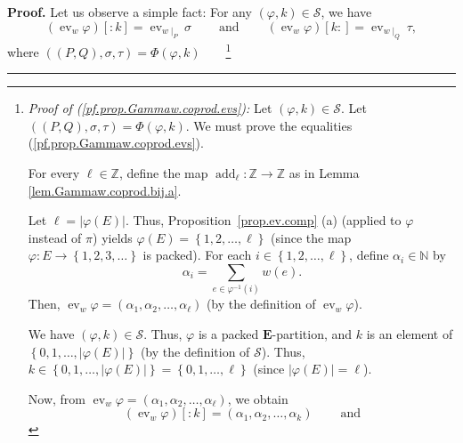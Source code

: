 \documentclass[numbers=enddot,12pt,final,onecolumn,notitlepage,abstracton]{scrartcl}
\theoremstyle{definition}
\newenvironment{proof}[1][Proof]{\noindent\textbf{#1.} }{\ \rule{0.5em}{0.5em}}
\let\sumnonlimits\sum
\renewcommand{\sum}{\sumnonlimits\limits}
\newenvironment{verlong}{}{}
\newcommand{\EE}{{\mathbf{E}}}
\newcommand{\NN}{{\mathbb{N}}}
\begin{document}
\begin{verlong}
\begin{proof}
Let us observe a simple fact: For any $\left(  \varphi,k\right)
\in\mathcal{S}$, we have%
\begin{equation}
\left(  \operatorname{ev}_{w}\varphi\right)  \left[  :k\right]
=\operatorname{ev}_{w\mid_{P}}\sigma\ \ \ \ \ \ \ \ \ \ \text{and}%
\ \ \ \ \ \ \ \ \ \ \left(  \operatorname{ev}_{w}\varphi\right)  \left[
k:\right]  =\operatorname{ev}_{w\mid_{Q}}\tau,
\label{pf.prop.Gammaw.coprod.evs}%
\end{equation}
where $\left(  \left(  P,Q\right)  ,\sigma,\tau\right)  =\Phi\left(
\varphi,k\right)  $\ \ \ \ \footnote{\textit{Proof of
(\ref{pf.prop.Gammaw.coprod.evs}):} Let $\left(  \varphi,k\right)
\in\mathcal{S}$. Let $\left(  \left(  P,Q\right)  ,\sigma,\tau\right)
=\Phi\left(  \varphi,k\right)  $. We must prove the equalities
(\ref{pf.prop.Gammaw.coprod.evs}).
\par
For every $\ell\in\mathbb{Z}$, define the map
$\operatorname{add}_{\ell}:\mathbb{Z}\rightarrow\mathbb{Z}$ as in
Lemma \ref{lem.Gammaw.coprod.bij.a}.
\par
Let $\ell=\left\vert \varphi\left(  E\right)  \right\vert $.
Thus, Proposition~\ref{prop.ev.comp} (a) (applied to $\varphi$
instead of $\pi$) yields
$\varphi\left(  E\right)  =\left\{  1,2,\ldots,\ell\right\}  $ (since
the map $\varphi : E \to \left\{ 1, 2, 3, \ldots \right\}$ is packed).
For each $i\in\left\{  1,2,\ldots,\ell\right\}  $,
define $\alpha_{i}\in \NN $ by
\begin{equation}
\alpha_{i}=\sum_{e\in\varphi^{-1}\left(  i\right)  }w\left(  e\right)  .
\label{pf.prop.Gammaw.coprod.evs.pf.alphai}%
\end{equation}
Then, $\operatorname{ev}_{w}\varphi=\left(  \alpha_{1},\alpha
_{2},\ldots,\alpha_{\ell}\right)  $ (by the definition of
$\operatorname{ev}_{w}\varphi$).
\par
We have $\left(  \varphi,k\right)  \in\mathcal{S}$. Thus, $\varphi$ is a
packed $\EE$-partition, and $k$ is an element of $\left\{
0,1,\ldots,\left\vert \varphi\left(  E\right)  \right\vert \right\}  $ (by the
definition of $\mathcal{S}$). Thus, $k\in\left\{  0,1,\ldots,\left\vert
\varphi\left(  E\right)  \right\vert \right\}  =\left\{  0,1,\ldots
,\ell\right\}  $ (since $\left\vert \varphi\left(  E\right)  \right\vert
=\ell$).
\par
Now, from $\operatorname{ev}_{w}\varphi=\left(  \alpha_{1}%
,\alpha_{2},\ldots,\alpha_{\ell}\right)  $, we obtain%
\[
\left(  \operatorname{ev}_{w}\varphi\right)  \left[  :k\right]  =\left(
\alpha_{1},\alpha_{2},\ldots,\alpha_{k}\right)  \ \ \ \ \ \ \ \ \ \ \text{and}%
\]}
\end{proof}
\end{verlong}
\end{document}
